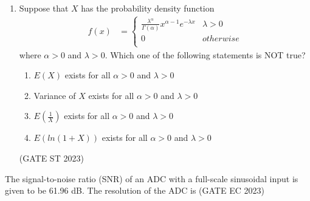 \begin{enumerate}[label=\thechapter.\arabic*,ref=\thechapter.\theenumi]
\item Suppose that $X$ has the probability density function
\begin{align}
f(x)&=
\begin{cases}
\frac{\lambda^{\alpha}}{\Gamma(\alpha)}x^{\alpha - 1} e^{-\lambda x} & \lambda > 0\\
0 & otherwise\\
\end{cases}
\end{align}
where $\alpha > 0$ and $\lambda > 0$. Which one of the following statements is NOT true?
\begin{enumerate}
\item $E(X)$ exists for all $\alpha > 0 $ and $ \lambda > 0$
\item Variance of $X$ exists for all $\alpha > 0$ and $\lambda > 0$
\item $E(\frac{1}{X})$ exists for all $\alpha > 0$ and $\lambda > 0$
\item $E(ln(1+X))$ exists for all $\alpha > 0$ and $\lambda > 0$
\end{enumerate}
\hfill (GATE ST 2023)\\

\end{enumerate}
\item The signal-to-noise ratio (SNR) of an ADC with a full-scale sinusoidal input is given to be 61.96 dB.
The resolution of the ADC is 
\hfill (GATE EC 2023)

